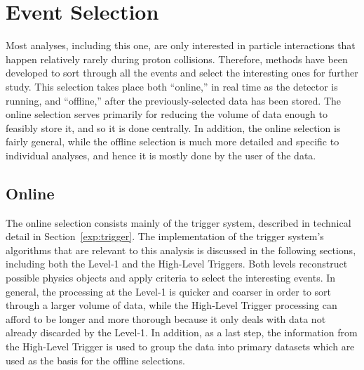 \newcommand{\AVal}{0.423}
\newcommand{\AEcalVal}{0.387}

\chapter{Event Selection}
\label{evSel}
Most analyses, including this one, are only interested in particle 
interactions that happen relatively rarely during proton collisions.  
Therefore, methods have been developed to sort through all the 
events and select the interesting ones for further study.  
This selection takes place both ``online,'' in real time as the 
detector is running, and ``offline,'' after the previously-selected data has 
been stored.  
The online selection serves primarily for reducing the 
volume of data enough to feasibly store it, and so it is done centrally. 
In addition, the online selection is fairly general, 
while the offline selection is much more detailed and specific to individual 
analyses, and hence it is mostly done by the user of the data.  


\section{Online}
\label{evSel:online}
The online selection consists mainly of the trigger system, 
described in technical detail in Section~\ref{exp:trigger}.  
The implementation of the trigger system's algorithms 
that are relevant to this analysis 
is discussed in the following sections, 
including both the Level-1 and the High-Level Triggers.  
Both levels reconstruct possible physics objects 
and apply criteria to select the interesting events.  
In general, the processing at the Level-1 is quicker 
and coarser in order to sort through a larger volume of data, 
while the High-Level Trigger processing can afford to be 
longer and more thorough because it only deals with 
data not already discarded by the Level-1.  
In addition, as a last step, the information 
from the High-Level Trigger is used to 
group the data into primary datasets
which are used as the basis for the offline selections.  

